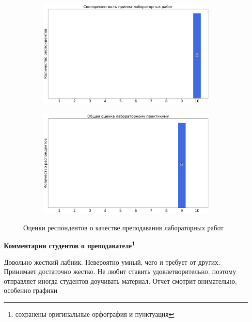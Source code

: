 \begin{figure}[H]
\begin{subfigure}[b]{0.45\textwidth}
                    \centering
                    \includegraphics[width=\textwidth]{images/3 course/Общая физика - квантовая физика/labniks-marks-Сафонов А.И.-2.png}
                \end{subfigure}
                \begin{subfigure}[b]{0.45\textwidth}
                    \centering
                    \includegraphics[width=\textwidth]{images/3 course/Общая физика - квантовая физика/labniks-marks-Сафонов А.И.-3.png}
                \end{subfigure}	
                \caption{Оценки респондентов о качестве преподавания лабораторных работ}
            \end{figure}

            \textbf{Комментарии студентов о преподавателе\protect\footnote{сохранены оригинальные орфография и пунктуация}}
                \begin{commentbox} 
                    Довольно жесткий лабник. Невероятно умный, чего и требует от других. Принимает достаточно жестко. Не любит ставить удовлетворительно, поэтому отправляет иногда студентов доучивать материал. Отчет смотрит внимательно, особенно графики  
                \end{commentbox}

